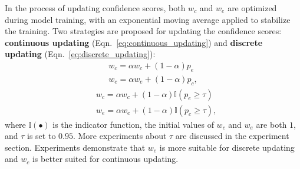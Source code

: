 In the process of updating confidence scores, both $w_{c}$ and $w_{e}$ are optimized during model training, with an exponential moving average applied to stabilize the training. Two strategies are proposed for updating the confidence scores: \textbf{continuous updating} (Eqn.~\ref{eq:continuous_updating}) and \textbf{discrete updating} (Eqn.~\ref{eq:discrete_updating}):
\begin{equation}
    \begin{aligned}
    w_{c}={\alpha}w_{c}+(1-{\alpha})p_{e}\\
    w_{e}={\alpha}w_{e}+(1-{\alpha})p_{c},
    \end{aligned}
    \label{eq:continuous_updating}
\end{equation}
\begin{equation}
    \begin{aligned}
        &w_{c}={\alpha}w_{c}+(1-{\alpha})\mathbb{I}(p_{e} \geq \tau)\\
        &w_{e}={\alpha}w_{e}+(1-{\alpha})\mathbb{I}(p_{c} \geq \tau),
    \end{aligned}
    \label{eq:discrete_updating}
\end{equation}
where $\mathbb{I}(\bullet)$ is the indicator function, the initial values of $w_{c}$ and $w_{e}$ are both $1$, and $\tau$ is set to $0.95$. More experiments about $\tau$ are discussed in the experiment section. Experiments demonstrate that $w_{e}$ is more suitable for discrete updating and $w_{c}$ is better suited for continuous updating.

